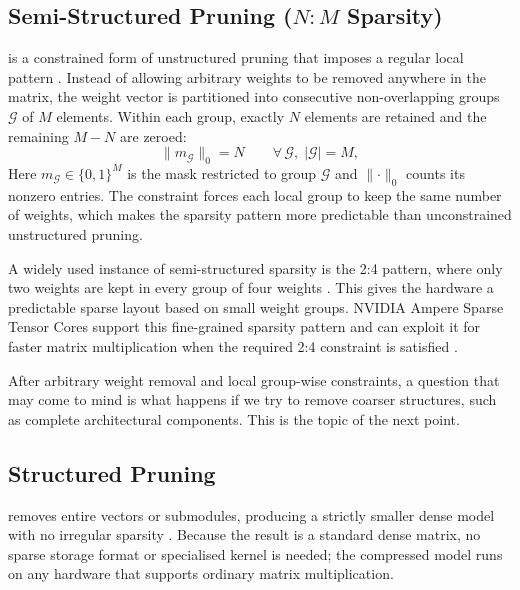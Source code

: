 \subsection{Semi-Structured Pruning ($N\!:\!M$ Sparsity)}
\label{subsec:semi_structured_pruning}

 is a constrained form of unstructured pruning
that imposes a regular local pattern \cite{mishra2021accelerating}. Instead
of allowing arbitrary weights to be removed anywhere in the matrix, the weight
vector is partitioned into consecutive non-overlapping groups $\mathcal{G}$ of
$M$ elements. Within each group, exactly $N$ elements are retained and the
remaining $M-N$ are zeroed:
\begin{equation}
	\lVert m_\mathcal{G} \rVert_0 = N \qquad \forall\,\mathcal{G},\;|\mathcal{G}|=M,
	\label{eq:nm_constraint}
\end{equation}
Here $m_\mathcal{G} \in \{0,1\}^M$ is the mask restricted to group
$\mathcal{G}$ and $\lVert \cdot \rVert_0$ counts its nonzero entries. The
constraint forces each local group to keep the same number of weights, which
makes the sparsity pattern more predictable than unconstrained unstructured
pruning.

A widely used instance of semi-structured sparsity is the 2:4 pattern,
where only two weights are kept in every group of four weights
\cite{pytorch2024semistructured,hu2024accelerating}. This gives the
hardware a predictable sparse layout based on small weight groups. NVIDIA
Ampere Sparse Tensor Cores support this fine-grained sparsity pattern and can
exploit it for faster matrix multiplication when the required 2:4 constraint
is satisfied \cite{nvidia2020a100,mishra2021accelerating}.

After arbitrary weight removal and local group-wise constraints, a question
that may come to mind is what happens if we try to remove coarser
structures, such as complete architectural components. This is the topic of
the next point.

\subsection{Structured Pruning}
\label{subsec:structured_pruning}

 removes entire vectors or submodules, producing a strictly smaller dense model with no irregular
sparsity \cite{li2017pruning}. Because the result is a standard dense matrix,
no sparse storage format or specialised kernel is needed; the compressed model
runs on any hardware that supports ordinary matrix multiplication.

